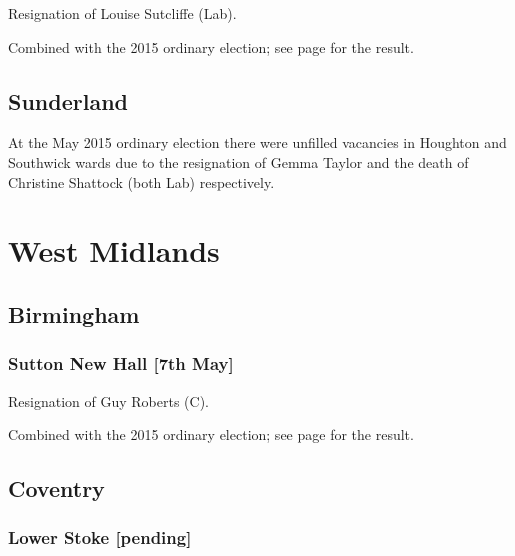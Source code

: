 \documentclass[a4paper,openany]{book}
\begin{document}
\begin{resultsiii}

Resignation of Louise Sutcliffe (Lab).

Combined with the 2015 ordinary election; see page \pageref{LemingtonNewcastleTyne} for the result.

\subsection*{Sunderland}

At the May 2015 ordinary election there were unfilled vacancies in Houghton and Southwick wards due to the resignation of Gemma Taylor and the death of Christine Shattock (both Lab) respectively.

\section{West Midlands}

\subsection*{Birmingham}

\subsubsection*{Sutton New Hall \hspace*{\fill}\nolinebreak[1]%
\enspace\hspace*{\fill}
[7th May]}


Resignation of Guy Roberts (C).

Combined with the 2015 ordinary election; see page \pageref{SuttonNewHallBirmingham} for the result.

\subsection*{Coventry}

\subsubsection*{Lower Stoke \hspace*{\fill}\nolinebreak[1]%
\enspace\hspace*{\fill}
[pending]}


\end{resultsiii}
\end{document}
